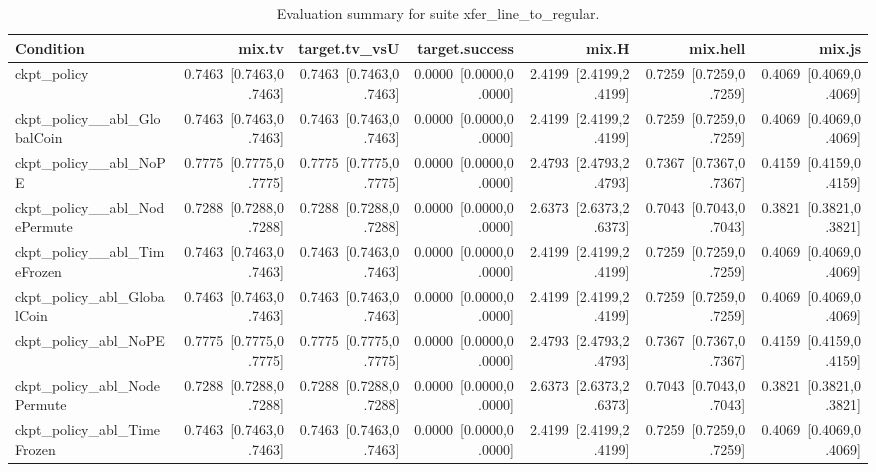 \begin{table}[t]
\centering
\caption{Evaluation summary for suite xfer_line_to_regular.}
\label{tab:eval_xfer_line_to_regular}
\begin{tabular}{lrrrrrr}
\toprule
Condition & mix.tv & target.tv\_vsU & target.success & mix.H & mix.hell & mix.js \\
\midrule
ckpt\_policy & 0.7463~[0.7463,0.7463] & 0.7463~[0.7463,0.7463] & 0.0000~[0.0000,0.0000] & 2.4199~[2.4199,2.4199] & 0.7259~[0.7259,0.7259] & 0.4069~[0.4069,0.4069] \\
ckpt\_policy\_\_abl\_GlobalCoin & 0.7463~[0.7463,0.7463] & 0.7463~[0.7463,0.7463] & 0.0000~[0.0000,0.0000] & 2.4199~[2.4199,2.4199] & 0.7259~[0.7259,0.7259] & 0.4069~[0.4069,0.4069] \\
ckpt\_policy\_\_abl\_NoPE & 0.7775~[0.7775,0.7775] & 0.7775~[0.7775,0.7775] & 0.0000~[0.0000,0.0000] & 2.4793~[2.4793,2.4793] & 0.7367~[0.7367,0.7367] & 0.4159~[0.4159,0.4159] \\
ckpt\_policy\_\_abl\_NodePermute & 0.7288~[0.7288,0.7288] & 0.7288~[0.7288,0.7288] & 0.0000~[0.0000,0.0000] & 2.6373~[2.6373,2.6373] & 0.7043~[0.7043,0.7043] & 0.3821~[0.3821,0.3821] \\
ckpt\_policy\_\_abl\_TimeFrozen & 0.7463~[0.7463,0.7463] & 0.7463~[0.7463,0.7463] & 0.0000~[0.0000,0.0000] & 2.4199~[2.4199,2.4199] & 0.7259~[0.7259,0.7259] & 0.4069~[0.4069,0.4069] \\
ckpt\_policy\_abl\_GlobalCoin & 0.7463~[0.7463,0.7463] & 0.7463~[0.7463,0.7463] & 0.0000~[0.0000,0.0000] & 2.4199~[2.4199,2.4199] & 0.7259~[0.7259,0.7259] & 0.4069~[0.4069,0.4069] \\
ckpt\_policy\_abl\_NoPE & 0.7775~[0.7775,0.7775] & 0.7775~[0.7775,0.7775] & 0.0000~[0.0000,0.0000] & 2.4793~[2.4793,2.4793] & 0.7367~[0.7367,0.7367] & 0.4159~[0.4159,0.4159] \\
ckpt\_policy\_abl\_NodePermute & 0.7288~[0.7288,0.7288] & 0.7288~[0.7288,0.7288] & 0.0000~[0.0000,0.0000] & 2.6373~[2.6373,2.6373] & 0.7043~[0.7043,0.7043] & 0.3821~[0.3821,0.3821] \\
ckpt\_policy\_abl\_TimeFrozen & 0.7463~[0.7463,0.7463] & 0.7463~[0.7463,0.7463] & 0.0000~[0.0000,0.0000] & 2.4199~[2.4199,2.4199] & 0.7259~[0.7259,0.7259] & 0.4069~[0.4069,0.4069] \\
\bottomrule
\end{tabular}
\end{table}
